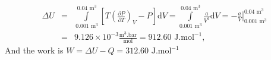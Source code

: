 \documentclass[calculator,allquestions,datasheet,mock,solutions]{exam_newMarcus2}
\newcommand{\frc}{\displaystyle\frac}
\renewcommand{\d}[1]{\mathrm{d} #1 }
\begin{document}
\begin{question}
\begin{enumerate}[(a)]
{       \begin{eqnarray}
         \Delta U &=& \int\limits_{0.001\text{ m}^{3}}^{0.04\text{ m}^{3}}\left[T\left(\frc{\partial P}{\partial T}\right)_{V}-P\right]\d V = \int\limits_{0.001\text{ m}^{3}}^{0.04\text{ m}^{3}} \frc{a}{V^{2}} \d V = -\left.\frc{a}{V}\right|_{0.001\text{ m}^{3}}^{0.04\text{ m}^{3}} \nonumber \\
                  &=& 9.126\times 10^{-3}\frc{\text{m}^{3}.\text{bar}}{\text{mol}} = 912.60\text{ J.mol}^{-1}, \nonumber
       \end{eqnarray}
       And the work is $W= \Delta U - Q=312.60\text{ J.mol}^{-1}$~

}
%
\end{enumerate} 
%
\end{question}

\clearpage
\end{document}

